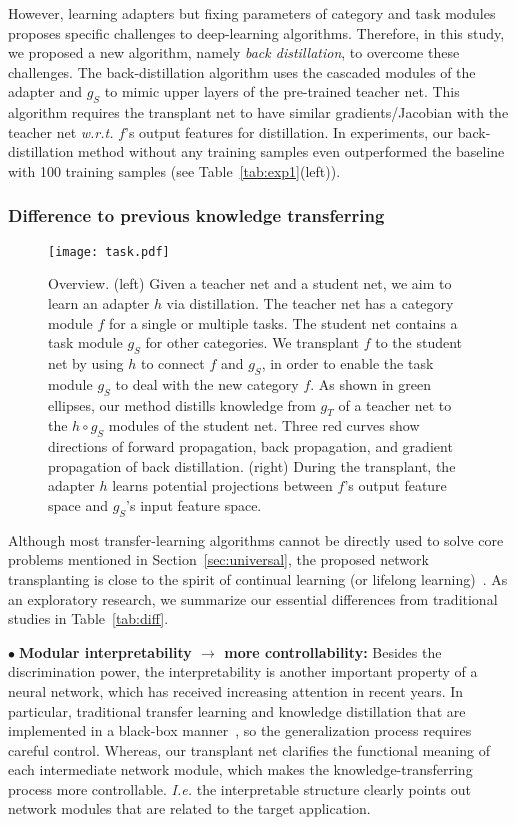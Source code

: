 \documentclass[10pt,twocolumn,letterpaper]{article}
\begin{document}
However, learning adapters but fixing parameters of category and task modules proposes specific challenges to deep-learning algorithms. Therefore, in this study, we proposed a new algorithm, namely \textit{back distillation}, to overcome these challenges. The back-distillation algorithm uses the cascaded modules of the adapter and $g_{S}$ to mimic upper layers of the pre-trained teacher net. This algorithm requires the transplant net to have similar gradients/Jacobian with the teacher net \emph{w.r.t.} $f$'s output features for distillation. In experiments, our back-distillation method without any training samples even outperformed the baseline with 100 training samples (see Table~\ref{tab:exp1}(left)).


\subsubsection{Difference to previous knowledge transferring}


\begin{figure*}[t]
\centering
\texttt{[image: task.pdf]}
\caption{Overview. (left) Given a teacher net and a student net, we aim to learn an adapter $h$ via distillation. The teacher net has a category module $f$ for a single or multiple tasks. The student net contains a task module {\small$g_{S}$} for other categories. We transplant $f$ to the student net by using $h$ to connect $f$ and {\small$g_{S}$}, in order to enable the task module {\small$g_{S}$} to deal with the new category $f$. As shown in green ellipses, our method distills knowledge from {\small$g_{T}$} of a teacher net to the {\small$h \circ g_{S}$} modules of the student net. Three red curves show directions of forward propagation, back propagation, and gradient propagation of back distillation. (right) During the transplant, the adapter $h$ learns potential projections between $f$'s output feature space and {\small$g_{S}$}'s input feature space.}
\label{fig:task}
\end{figure*}

Although most transfer-learning algorithms cannot be directly used to solve core problems mentioned in Section~\ref{sec:universal}, the proposed network transplanting is close to the spirit of continual learning (or lifelong learning)~\cite{ProgressiveNN,PathNet,continualLearning,LifelongLearning,metaContinual}. As an exploratory research, we summarize our essential differences from traditional studies in Table~\ref{tab:diff}.

\noindent
$\bullet\;$\textbf{Modular interpretability $\rightarrow$ more controllability:} Besides the discrimination power, the interpretability is another important property of a neural network, which has received increasing attention in recent years. In particular, traditional transfer learning and knowledge distillation that are implemented in a black-box manner~\cite{ProgressiveNN,netMerger}, so the generalization process requires careful control. Whereas, our transplant net clarifies the functional meaning of each intermediate network module, which makes the knowledge-transferring process more controllable. \emph{I.e.} the interpretable structure clearly points out network modules that are related to the target application.
\end{document}
